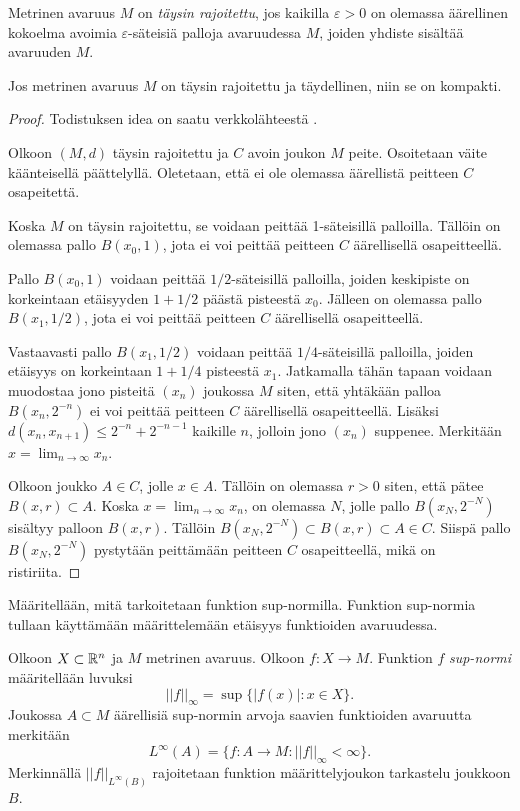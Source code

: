 \documentclass[12pt,oneside,a4paper]{amsbook} %
\begin{document}
\begin{definition}
    Metrinen avaruus $M$ on \textit{täysin rajoitettu}, jos kaikilla $\varepsilon > 0$ on olemassa äärellinen kokoelma avoimia $\varepsilon$-säteisiä palloja avaruudessa $M$, joiden yhdiste sisältää avaruuden $M$.
\end{definition}

\begin{theorem}\label{thm:compactness}
    Jos metrinen avaruus $M$ on täysin rajoitettu ja täydellinen, niin se on kompakti.
\end{theorem}
\begin{proof}
Todistuksen idea on saatu verkkolähteestä \cite{gibara}.

Olkoon $(M, d)$ täysin rajoitettu ja $C$ avoin joukon $M$ peite. Osoitetaan väite käänteisellä päättelyllä. Oletetaan, että ei ole olemassa äärellistä peitteen $C$ osapeitettä.

Koska $M$ on täysin rajoitettu, se voidaan peittää 1-säteisillä palloilla. Tällöin on olemassa pallo $B(x_0,1)$, jota ei voi peittää peitteen $C$ äärellisellä osapeitteellä.

Pallo $B(x_0,1)$ voidaan peittää $1/2$-säteisillä palloilla, joiden keskipiste on korkeintaan etäisyyden $1 + 1/2$ päästä pisteestä $x_0$. Jälleen on olemassa pallo $B(x_1, 1/2)$, jota ei voi peittää peitteen $C$ äärellisellä osapeitteellä.

Vastaavasti pallo $B(x_1, 1/2)$ voidaan peittää $1/4$-säteisillä palloilla, joiden etäisyys on korkeintaan $1+1/4$ pisteestä $x_1$. Jatkamalla tähän tapaan voidaan muodostaa jono pisteitä $(x_n)$ joukossa $M$ siten, että yhtäkään palloa $B(x_n, 2^{-n})$ ei voi peittää peitteen $C$ äärellisellä osapeitteellä. Lisäksi $d(x_n, x_{n+1})  \le 2^{-n} + 2^{-n-1}$ kaikille $n$, jolloin jono $(x_n)$ suppenee. Merkitään $x = \lim_{n\to\infty} x_n$.

Olkoon joukko $A \in C$, jolle $x \in A$. Tällöin on olemassa $r > 0$ siten, että pätee $B(x,r) \subset A$. Koska $x = \lim_{n\to\infty} x_n$, on olemassa $N$, jolle pallo $B(x_N, 2^{-N})$ sisältyy palloon $B(x, r)$. Tällöin $B(x_N, 2^{-N}) \subset B(x, r) \subset A \in C$. Siispä pallo $B(x_N, 2^{-N})$ pystytään peittämään peitteen $C$ osapeitteellä, mikä on ristiriita.
\end{proof}

Määritellään, mitä tarkoitetaan funktion sup-normilla. Funktion sup-normia tullaan käyttämään määrittelemään etäisyys funktioiden avaruudessa.

\begin{definition}
Olkoon $X\subset \mathbb{R}^n$ ja $M$ metrinen avaruus. Olkoon $f: X \to M$.
Funktion $f$ \textit{sup-normi} määritellään luvuksi
\begin{equation*}
    ||f||_\infty = \sup\{|f(x)| : x \in X\}.
\end{equation*}
Joukossa $A\subset M$ äärellisiä sup-normin arvoja saavien funktioiden avaruutta merkitään
    \[L^\infty (A) = \{f:A\to M \colon  ||f||_\infty < \infty\}.\] 
Merkinnällä $||f||_{L^\infty(B)}$ rajoitetaan funktion määrittelyjoukon tarkastelu joukkoon $B$.
\end{definition}
\end{document}
